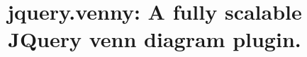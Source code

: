 \documentclass{bmcart}
\begin{document}
\begin{frontmatter}

\begin{fmbox}


\title{jquery.venny: A fully scalable JQuery venn diagram plugin.}


\author[
   addressref={aff1},                   %
   corref={aff1},                       %
   noteref={n1},                        %
   email={jane.e.doe@cambridge.co.uk}   %
]{ }
\author[
   addressref={aff1,aff2},
   email={john.RS.Smith@cambridge.co.uk}
]{ }


\address[id=aff1]{%
  , %
  ,                     %
  ,                              %
}
\address[id=aff2]{%
  ,
  ,
  ,
}


\end{fmbox}
\end{frontmatter}
\end{document}
